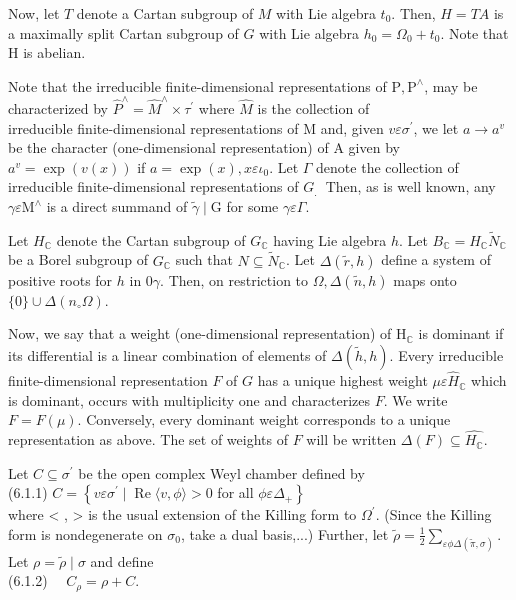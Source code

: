 \documentclass[10pt]{article}
\begin{document}
Now, let $T$ denote a Cartan subgroup of $M$ with Lie algebra $t_{0}$. Then, $H=T A$ is a maximally split Cartan subgroup of $G$ with Lie algebra $h_{0}=\Omega_{0}+t_{0}$. Note that H is abelian.

Note that the irreducible finite-dimensional representations of $\mathrm{P}, \mathrm{P}^{\wedge}$, may be characterized by $\hat{P}^{\wedge}=\hat{M}^{\wedge} \times \tau^{\prime}$ where $\hat{M}$ is the collection of\\
irreducible finite-dimensional representations of M and, given $v \varepsilon \sigma^{\prime}$, we let $a \rightarrow a^{v}$ be the character (one-dimensional representation) of A given by $a^{v}=\exp (v(x))$ if $a=\exp (x), x \varepsilon \iota_{0}$. Let $\Gamma$ denote the collection of irreducible finite-dimensional representations of $G_{\text {. }}$ Then, as is well known, any $\gamma \varepsilon \mathrm{M}^{\wedge}$ is a direct summand of $\tilde{\gamma} \mid \mathrm{G}$ for some $\gamma \varepsilon \Gamma$.

Let $H_{\mathbb{C}}$ denote the Cartan subgroup of $G_{\mathbb{C}}$ having Lie algebra $h$. Let $B_{\mathbb{C}}=H_{\mathbb{C}} \tilde{N}_{\mathbb{C}}$ be a Borel subgroup of $G_{\mathbb{C}}$ such that $N \subseteq \tilde{N}_{\mathbb{C}}$. Let $\Delta(\tilde{r}, h)$ define a system of positive roots for $h$ in $0 \gamma$. Then, on restriction to $\Omega, \Delta(\tilde{n}, h)$ maps onto $\{0\} \cup \Delta\left(n_{\circ} \Omega\right)$.

Now, we say that a weight (one-dimensional representation) of $\mathrm{H}_{\mathbb{C}}$ is dominant if its differential is a linear combination of elements of $\Delta(\tilde{h}, h)$. Every irreducible finite-dimensional representation $F$ of $G$ has a unique highest weight $\mu \varepsilon \hat{H}_{\mathbb{C}}$ which is dominant, occurs with multiplicity one and characterizes $F$. We write $F=F(\mu)$. Conversely, every dominant weight corresponds to a unique representation as above. The set of weights of $F$ will be written $\Delta(F) \subseteq \hat{H_{\mathbb{C}}}$.

Let $C \subseteq \sigma^{\prime}$ be the open complex Weyl chamber defined by\\
(6.1.1) $C=\left\{v \varepsilon \sigma^{\prime} \mid \operatorname{Re}\langle v, \phi\rangle>0\right.$ for all $\left.\phi \varepsilon \Delta_{+}\right\}$\\
where < , > is the usual extension of the Killing form to $\Omega^{\prime}$. (Since the Killing form is nondegenerate on $\sigma_{0}$, take a dual basis,...) Further, let $\tilde{\rho}=\frac{1}{2} \sum_{\varepsilon \phi \Delta(\tilde{\pi}, \sigma)}$. Let $\rho=\tilde{\rho} \mid \sigma$ and define\\
(6.1.2) $\quad C_{\rho}=\rho+C$.
\end{document}
